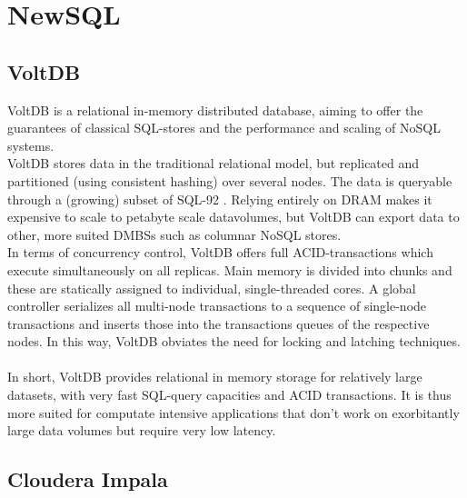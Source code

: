\documentclass{IEEEtran}
\begin{document}
\section{NewSQL}
\subsection{VoltDB}

VoltDB is a relational in-memory distributed database, aiming to offer the guarantees of classical SQL-stores and the performance and scaling of NoSQL systems\cite{stonebraker2013voltdb}. %
\\VoltDB stores data in the traditional relational model, but replicated and partitioned (using consistent hashing) over several nodes\cite{grolinger2013data}. The data is queryable through a (growing) subset of SQL-92 \cite{voltdb2010voltdb}.
Relying entirely on DRAM makes it expensive to scale to petabyte scale datavolumes, but VoltDB can export data to other, more suited DMBSs such as columnar NoSQL stores.
\\In terms of concurrency control, VoltDB offers full ACID-transactions which execute simultaneously on all replicas. Main memory is divided into chunks and these are statically assigned to individual, single-threaded cores. A global controller serializes all multi-node transactions to a sequence of single-node transactions and inserts those into the transactions queues of the respective nodes. In this way, VoltDB obviates the need for locking and latching techniques.
\\\\
In short, VoltDB provides relational in memory storage for relatively large datasets, with very fast SQL-query capacities and ACID transactions. It is thus more suited for computate intensive applications that don't work on exorbitantly large data volumes but require very low latency.

\subsection{Cloudera Impala}
\end{document}
